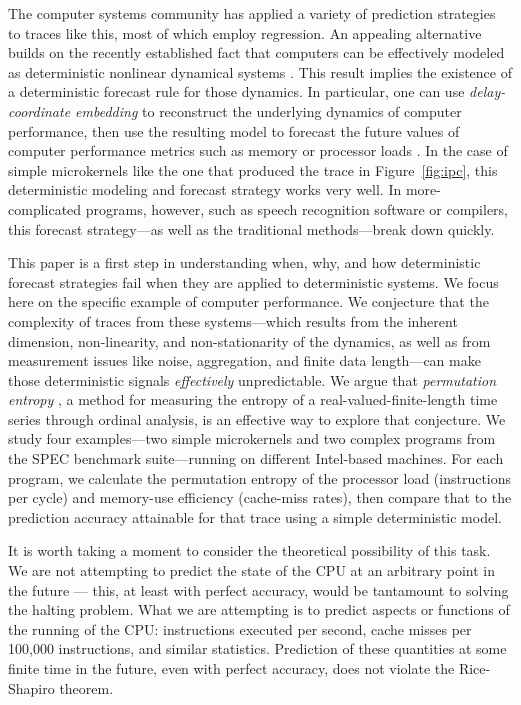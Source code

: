 \documentclass{article}
\begin{document}
The computer systems community has applied a variety of prediction
strategies to traces like this, most of which employ regression.  An
appealing alternative builds on the recently established fact that
computers can be effectively modeled as deterministic nonlinear
dynamical systems \cite{mytkowicz09}.  This result implies the
existence of a deterministic forecast rule for those dynamics.  In
particular, one can use \emph{delay-coordinate embedding} to
reconstruct the underlying dynamics of computer performance, then use
the resulting model to forecast the future values of computer
performance metrics such as memory or processor loads
\cite{josh-ida2011}.  In the case of simple microkernels like the one
that produced the trace in Figure~\ref{fig:ipc}, this deterministic
modeling and forecast strategy works very well.  In more-complicated
programs, however, such as speech recognition software or compilers,
this forecast strategy---as well as the traditional methods---break
down quickly.

This paper is a first step in understanding when, why, and how
deterministic forecast strategies fail when they are applied to
deterministic systems.  We focus here on the specific example of
computer performance.  We conjecture that the complexity of traces
from these systems---which results from the inherent dimension,
non-linearity, and non-stationarity of the dynamics, as well as from
measurement issues like noise, aggregation, and finite data
length---can make those deterministic signals \emph{effectively}
unpredictable.  We argue that \emph{permutation entropy}
\cite{bandt2002per}, a method for measuring the entropy of a
real-valued-finite-length time series through ordinal analysis, is an
effective way to explore that conjecture.  We study four
examples---two simple microkernels and two complex programs from the
SPEC benchmark suite---running on different Intel-based machines.  For
each program, we calculate the permutation entropy of the processor
load (instructions per cycle) and memory-use efficiency (cache-miss
rates), then compare that to the prediction accuracy attainable for
that trace using a simple deterministic model.

It is worth taking a moment to consider the theoretical possibility of
this task. We are not attempting to predict the state of the CPU at an
arbitrary point in the future --- this, at least with perfect
accuracy, would be tantamount to solving the halting problem. What we
are attempting is to predict aspects or functions of the running of
the CPU: instructions executed per second, cache misses per 100,000
instructions, and similar statistics. Prediction of these quantities
at some finite time in the future, even with perfect accuracy, does
not violate the Rice-Shapiro theorem.
\end{document}
